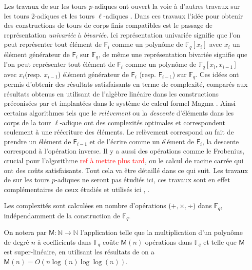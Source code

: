 \documentclass[10pt,a4paper]{book}
\theoremstyle{plain}
\theoremstyle{definition}
\theoremstyle{definition}
\theoremstyle{definition}
\theoremstyle{definition}
\theoremstyle{remark}
\theoremstyle{remark}
\theoremstyle{definition}
\begin{document}
Les travaux de \cite{DeFeo-Shost'12} sur les tours $p$-adiques ont ouvert la voie à d'autres travaux sur les tours $2$-adiques \cite{Doliskani-Schost15} et les tours $\ell$-adiques \cite{DeFeo-Doliskani-Schost13}. Dans ces travaux l'idée pour obtenir des constructions de tours de corps finis compatibles est le passage de représentation \textit{univariée} à \textit{bivariée}. Ici représentation univariée signifie que l'on peut représenter tout élément de $\mathsf{F}_i$ comme un polynôme de $\mathbb{F}_q[x_i]$ avec $x_i$ un élément générateur de $\mathsf{F}_i$ sur $\mathbb{F}_q$, de même une représentation bivariée signifie que l'on peut représenter tout élément de $\mathsf{F}_i$ comme un polynôme de $\mathbb{F}_q[x_i, x_{i-1}]$ avec $x_i$(resp. $x_{i-1}$) élément générateur de $\mathsf{F}_i$ (resp. $\mathsf{F}_{i-1}$) sur $\mathbb{F}_q$. Ces idées ont permis d'obtenir des résultats satisfaisants en terme de complexité, comparés aux résultats obtenus en utilisant de l'algèbre linéaire dans les constructions préconisées par \cite{BosmaCS97} et implantées dans le système de calcul formel Magma \cite{magma97}. Ainsi certains algorithmes tels que le \textit{relèvement} ou la \textit{descente} d'éléments dans les corps de la tour $\ell$-adique ont des complexités optimales et correspondent seulement à une réécriture des éléments. Le relèvement correspond au fait de prendre un élément de $\mathsf{F}_{i-1}$ et de l'écrire comme un élément de $\mathsf{F}_i$, la descente correspond à l'opération inverse. Il y a aussi des opérations comme le Frobenius, crucial pour l'algorithme \textcolor{red}{ref à mettre plus tard}, ou le calcul de racine carrée qui ont des coûts satisfaisants. Tout cela va être détaillé dans ce qui suit. Les travaux de  \cite{DeFeo-Shost'12} sur les tours $p$-adiques ne seront pas étudiés ici, ces travaux sont en effet complémentaires de ceux étudiés et utilisés ici \cite{Doliskani-Schost15}, \cite{DeFeo-Doliskani-Schost13}.

Les complexités sont calculées en nombre d'opérations ($+, \times,\div$) dans $\mathbb{F}_q$, indépendamment de la construction de $\mathbb{F}_q$. 

On notera par $\mathsf{M}: \mathbb{N} \rightarrow \mathbb{N}$ l'application telle que la multiplication d'un polynôme de degré $n$ à coefficients dans $\mathbb{F}_q$ coûte $\mathsf{M}(n)$ opérations dans $\mathbb{F}_q$ et telle que $\mathsf{M}$ est super-linéaire, en utilisant les résultats de \cite{Cantor-Kaltofen91} on a $\mathsf{M}(n)=O(n\log(n) \log \log(n))$. 
\end{document}
